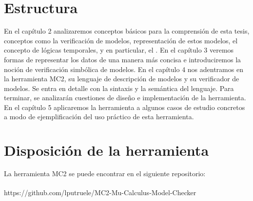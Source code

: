 \section{Estructura}
En el capítulo 2 analizaremos conceptos básicos para la comprensión de esta tesis, conceptos como la verificación de modelos, representación de estos modelos, el concepto de lógicas temporales, y en particular, el {\mucalculo}.
En el capítulo 3 veremos formas de representar los datos de una manera más concisa e introduciremos la noción de verificación simbólica de modelos.
En el capítulo 4 nos adentramos en la herramienta MC2, su lenguaje de descripción de modelos y su verificador de modelos. Se entra en detalle con la sintaxis y la semántica del lenguaje. Para terminar, se analizarán cuestiones de diseño e implementación de la herramienta. 
En el capítulo 5 aplicaremos la herramienta a algunos casos de estudio concretos a modo de ejemplificación del uso práctico de esta herramienta.

\section{Disposición de la herramienta}

La herramienta MC2 se puede encontrar en el siguiente repositorio:\\
\\
https://github.com/lputruele/MC2-Mu-Calculus-Model-Checker



